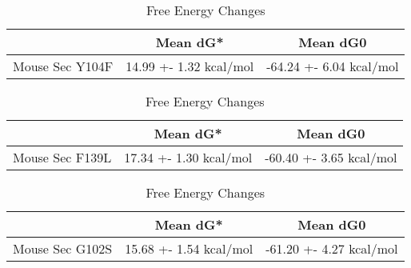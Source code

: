                                 \begin{table}[ht]
                                  \centering
                                  \begin{tabular}{|c|c|c|}
                                  \hline
                                    & Mean dG* & Mean dG0 \\
                                  \hline
                                  Mouse Sec Y104F & 14.99 +- 1.32 kcal/mol & -64.24 +- 6.04 kcal/mol \\
                                  \hline
                                  \end{tabular}
                                  \caption{Free Energy Changes}
                                  \end{table}

                                    \begin{table}[ht]
                                        \centering
                                        \begin{tabular}{|c|c|c|}
                                        \hline
                                          & Mean dG* & Mean dG0 \\
                                        \hline
                                        Mouse Sec  F139L & 17.34 +- 1.30 kcal/mol & -60.40 +- 3.65 kcal/mol \\
                                        \hline
                                        \end{tabular}
                                        \caption{Free Energy Changes}
                                        \end{table}
                                        

                                        \begin{table}[ht]
                                            \centering
                                            \begin{tabular}{|c|c|c|}
                                            \hline
                                              & Mean dG* & Mean dG0 \\
                                            \hline
                                            Mouse Sec  G102S & 15.68 +- 1.54 kcal/mol & -61.20 +- 4.27 kcal/mol \\
                                            \hline
                                            \end{tabular}
                                            \caption{Free Energy Changes}
                                            \end{table}
                                                    
